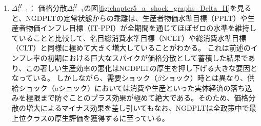 \begin{enumerate}
        名目GDPを目標としているため、供給ショックによる影響を吸収して実体経済へのダメージを緩和する過程で、インフレ率の大きな上昇を許容している。この初期におけるインフレ率の大きな乖離が、次項で述べる価格分散の増大をもたらす要因となっている。
    \item
    \label{itm:chapter5_a_shock_policies_ngdplt_Delta_t_minus_1_H}
        \(\Delta_{t-1}^H\)：
        価格分散\(\Delta_{t-1}^H\)の図\ref{fig:chapter5_a_shock_graphs_Delta_H}を見ると、NGDPLTの定常状態からの乖離は、生産者物価水準目標（PPLT）や生産者物価インフレ目標（IT-PPI）が全期間を通じてほぼゼロの水準を維持していることと比較して、名目総消費水準目標（NCLT）や総消費水準目標（CLT）と同様に極めて大きく増大していることがわかる。
        これは前述のインフレ率の初期における巨大なスパイクが価格分散として蓄積した結果であり、この著しい生産効率の悪化はNGDPLTの厚生を押し下げる大きな要因となっている。
        しかしながら、需要ショック（\(\beta\)ショック）時とは異なり、供給ショック（\(a\)ショック）においては消費や生産といった実体経済の落ち込みを極限まで防ぐことのプラス効果が極めて絶大である。そのため、価格分散の増大によるマイナス効果を差し引いてもなお、NGDPLTは全政策中で最上位クラスの厚生評価を獲得するに至っている。
\end{enumerate}